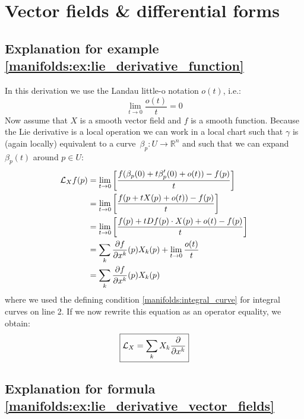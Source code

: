 \section{Vector fields \& differential forms}
\subsection{Explanation for example \ref{manifolds:ex:lie_derivative_function}}

	In this derivation we use the Landau little-o notation $o(t)$, i.e.:
	\begin{equation}
		\lim_{t\rightarrow0}\frac{o(t)}{t} = 0
	\end{equation}
	Now assume that $X$  is a smooth vector field and $f$ is a smooth function. Because the Lie derivative is a local operation we can work in a local chart such that $\gamma$ is (again locally) equivalent to a curve\footnotemark\ $\beta_p:U\rightarrow\mathbb{R}^n$ and such that we can expand $\beta_p(t)$ around $p\in U$:
	\begin{align}
		\mathcal{L}_Xf(p) &= \lim_{t\rightarrow0}\left[\stylefrac{f(\beta_p(0) + t\beta_p'(0) + o(t)) - f(p)}{t}\right]\nonumber\\
		&= \lim_{t\rightarrow0}\left[\stylefrac{f(p + tX(p) + o(t)) - f(p)}{t}\right]\nonumber\\
		&= \lim_{t\rightarrow0}\left[\stylefrac{f(p) + tDf(p)\cdot X(p) + o(t) - f(p)}{t}\right]\nonumber\\
		&= \sum_k\pderiv{f}{x^k}(p)X_k(p) + \lim_{t\rightarrow0}\stylefrac{o(t)}{t}\nonumber\\
		&= \sum_k\pderiv{f}{x^k}(p)X_k(p)\label{manifolds:lie_derivative_calc}
	\end{align}
	where we used the defining condition \ref{manifolds:integral_curve} for integral curves on line 2. If we now rewrite this equation as an operator equality, we obtain:
	\begin{equation}
		\boxed{\mathcal{L}_X = \sum_kX_k\frac{\partial }{\partial x^k}}
	\end{equation}
		
\subsection{Explanation for formula \ref{manifolds:ex:lie_derivative_vector_fields}}

